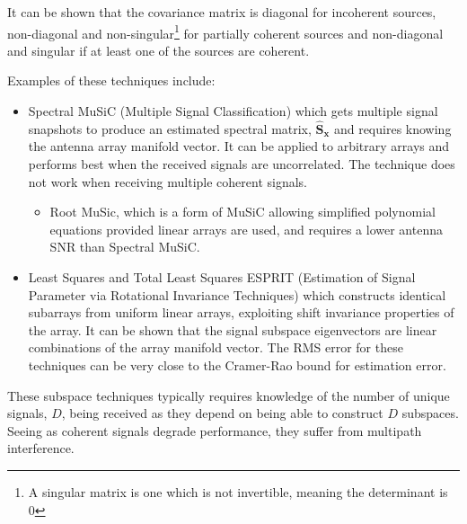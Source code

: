 It can be shown that the covariance matrix is diagonal for incoherent sources, non-diagonal and non-singular\footnote{A singular matrix is one which is not invertible, meaning the determinant is 0} for partially coherent sources and non-diagonal and singular if at least one of the sources are coherent\cite{poisel2012electronic}. 

Examples of these techniques include\cite{van2004detection}:
\begin{itemize}
  \item Spectral MuSiC (Multiple Signal Classification) which gets multiple signal snapshots to produce an estimated spectral matrix, \(\hat{\mathbf{S}}_{\mathbf{x}}\) and requires knowing the antenna array manifold vector. It can be applied to arbitrary arrays and performs best when the received signals are uncorrelated. The technique does not work when receiving multiple coherent signals.
    \begin{itemize}
      \item Root MuSic, which is a form of MuSiC allowing simplified polynomial equations provided linear arrays are used, and requires a lower antenna SNR than Spectral MuSiC.
    \end{itemize}
  \item Least Squares and Total Least Squares ESPRIT (Estimation of Signal Parameter via Rotational Invariance Techniques) which constructs identical subarrays from uniform linear arrays, exploiting shift invariance properties of the array. It can be shown that the signal subspace eigenvectors are linear combinations of the array manifold vector. The RMS error for these techniques can be very close to the Cramer-Rao bound for estimation error\cite{van2004detection}.
\end{itemize}
These subspace techniques typically requires knowledge of the number of unique signals, \(D\), being received as they depend on being able to construct \(D\) subspaces. Seeing as coherent signals degrade performance, they suffer from multipath interference.
